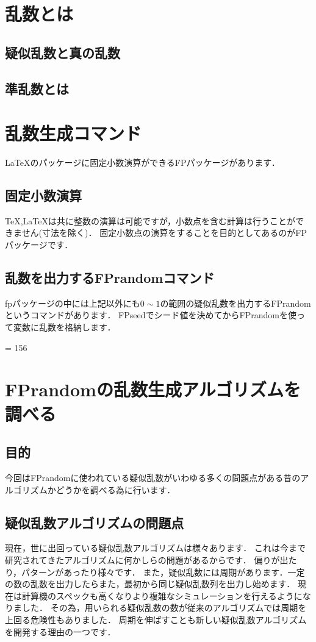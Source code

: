 \section{乱数とは}
\subsection{疑似乱数と真の乱数}
\subsection{準乱数とは}

\section{乱数生成コマンド}
\LaTeX のパッケージに固定小数演算ができるFPパッケージがあります．
\subsection{固定小数演算}
\TeX ,\LaTeX は共に整数の演算は可能ですが，小数点を含む計算は行うことができません(寸法を除く)．
固定小数点の演算をすることを目的としてあるのがFPパッケージです．
\subsection{乱数を出力するFPrandomコマンド}
fpパッケージの中には上記以外にも$0\sim 1$の範囲の疑似乱数を出力するFPrandomというコマンドがあります．
FPseedでシード値を決めてからFPrandomを使って変数に乱数を格納します．
\begin{texcode}
\FPseed = 156
\FPrandom{\result}
\FPprint{\result}
\end{texcode}

\section{FPrandomの乱数生成アルゴリズムを調べる}
\subsection{目的}
今回はFPrandomに使われている疑似乱数がいわゆる多くの問題点がある昔のアルゴリズムかどうかを調べる為に行います．

\subsection{疑似乱数アルゴリズムの問題点}
現在，世に出回っている疑似乱数アルゴリズムは様々あります．
これは今まで研究されてきたアルゴリズムに何かしらの問題があるからです．
偏りが出たり，パターンがあったり様々です．
また，疑似乱数には周期があります．一定の数の乱数を出力したらまた，最初から同じ疑似乱数列を出力し始めます．
現在は計算機のスペックも高くなりより複雑なシミュレーションを行えるようになりました．
その為，用いられる疑似乱数の数が従来のアルゴリズムでは周期を上回る危険性もありました．
周期を伸ばすことも新しい疑似乱数アルゴリズムを開発する理由の一つです．

